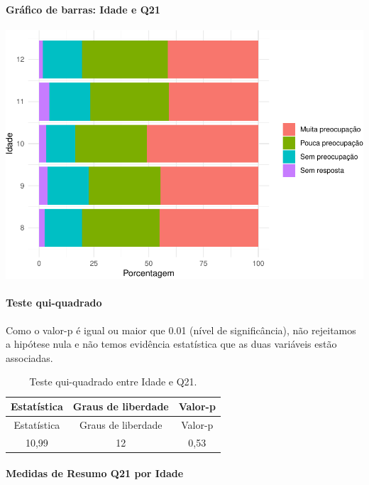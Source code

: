 \documentclass[]{article}
\let\oldparagraph\paragraph
\renewcommand{\paragraph}[1]{\oldparagraph{#1}\mbox{}}
\begin{document}
\hypertarget{gruxe1fico-de-barras-idade-e-q21}{%
\paragraph{Gráfico de barras: Idade e Q21}\label{gruxe1fico-de-barras-idade-e-q21}}

\begin{center}\includegraphics[width=0.75\linewidth]{relatorio_covid19_files/figure-latex/unnamed-chunk-446-1} \end{center}

\hypertarget{teste-qui-quadrado-39}{%
\paragraph{Teste qui-quadrado}\label{teste-qui-quadrado-39}}

Como o valor-p é igual ou maior que 0.01 (nível de significância), não rejeitamos a hipótese nula e não temos evidência estatística que as duas variáveis estão associadas.

\begin{longtable}[]{@{}ccc@{}}
\caption{\label{tab:unnamed-chunk-448}Teste qui-quadrado entre Idade e Q21.}\tabularnewline
\toprule
Estatística & Graus de liberdade & Valor-p\tabularnewline
\midrule
\endfirsthead
\toprule
Estatística & Graus de liberdade & Valor-p\tabularnewline
\midrule
\endhead
10,99 & 12 & 0,53\tabularnewline
\bottomrule
\end{longtable}

\cleardoublepage

\hypertarget{medidas-de-resumo-q21-por-idade}{%
\paragraph{Medidas de Resumo Q21 por Idade}\label{medidas-de-resumo-q21-por-idade}}
\end{document}
